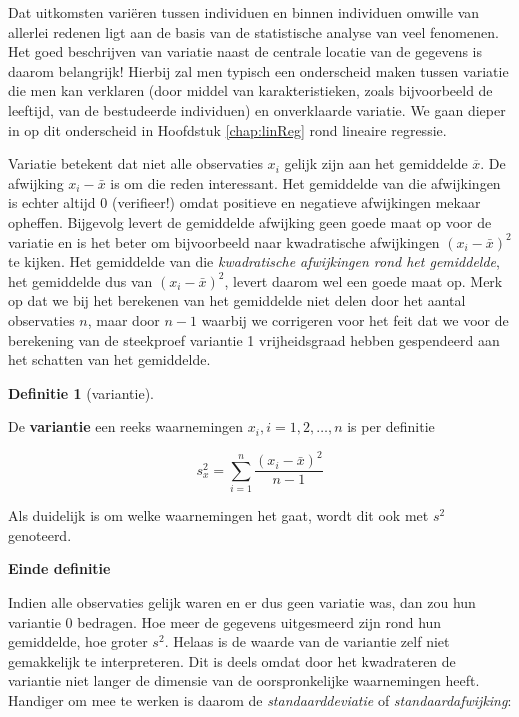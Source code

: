 \documentclass[
  12pt,dutch,coursenotes]{book}
\theoremstyle{definition}
\newtheorem{definition}{Definitie}[chapter]
\theoremstyle{definition}
\theoremstyle{definition}
\theoremstyle{remark}
\begin{document}
Dat uitkomsten variëren tussen individuen en binnen individuen omwille van
allerlei redenen ligt aan de basis van de statistische analyse van veel
fenomenen. Het goed beschrijven van variatie naast de centrale locatie van
de gegevens is daarom belangrijk! Hierbij zal men typisch een
onderscheid maken tussen variatie die men kan verklaren (door middel van
karakteristieken, zoals bijvoorbeeld de leeftijd, van de bestudeerde individuen) en onverklaarde variatie. We gaan
dieper in op dit onderscheid in Hoofdstuk \ref{chap:linReg} rond lineaire regressie.

Variatie betekent dat niet alle observaties \(x_i\) gelijk zijn aan het
gemiddelde \(\overline{x}\). De afwijking \(x_i - \bar{x}\) is om die reden
interessant. Het gemiddelde van die afwijkingen is echter altijd 0
(verifieer!) omdat positieve en negatieve afwijkingen mekaar opheffen.
Bijgevolg levert de gemiddelde afwijking geen goede maat op voor de variatie
en is het beter om bijvoorbeeld naar kwadratische afwijkingen \((x_i - \bar{x})^2\) te kijken. Het gemiddelde van die \emph{kwadratische afwijkingen rond het gemiddelde}, het gemiddelde dus van \((x_i - \bar{x})^2\), levert daarom
wel een goede maat op. Merk op dat we bij het berekenen van het gemiddelde niet delen door het aantal observaties \(n\), maar door \(n-1\) waarbij we corrigeren voor het feit dat we voor de berekening van de steekproef variantie 1 vrijheidsgraad hebben gespendeerd aan het schatten van het gemiddelde.

\begin{definition}[variantie]
\protect\hypertarget{def:unnamed-chunk-101}{}{\label{def:unnamed-chunk-101} \iffalse (variantie) \fi{} }
\end{definition}
De \textbf{variantie} een reeks waarnemingen \(x_i, i=1, 2, \dots, n\) is per
definitie

\begin{equation*}
s^2_x = \sum_{i=1}^{n} \frac{(x_i - \bar{x})^2}{n-1}
\end{equation*}

Als duidelijk is om welke waarnemingen het gaat, wordt dit ook met \(s^2\)
genoteerd.

\textbf{Einde definitie}

Indien alle observaties gelijk waren en er dus geen variatie was, dan zou
hun variantie 0 bedragen. Hoe meer de gegevens uitgesmeerd zijn rond hun
gemiddelde, hoe groter \(s^2\). Helaas is de waarde van de variantie zelf niet
gemakkelijk te interpreteren. Dit is deels omdat door het kwadrateren de
variantie niet langer de dimensie van de oorspronkelijke waarnemingen heeft.
Handiger om mee te werken is daarom de \emph{standaarddeviatie} of \emph{
standaardafwijking}:
\end{document}
